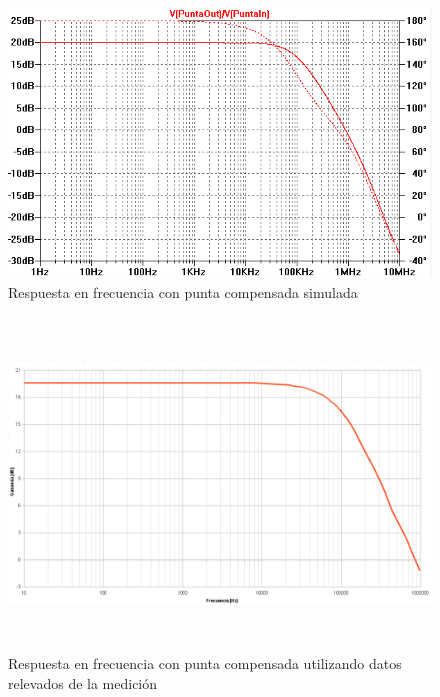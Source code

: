 \documentclass[10pt,spanish,a4paper,openany,notitlepage]{article}
\begin{document}
\begin{enumerate}
\begin{figure}[H]
\centering
\includegraphics[scale=0.8]{simulaciones/A2puntax10.png}
\caption{Respuesta en frecuencia con punta compensada simulada}
\label{fig:2_10x}
\end{figure}

\begin{figure}[H]
\centering
\includegraphics[width=350pt, height=250pt]{mediciones/A2dB_vs_Frec.png}
\caption{Respuesta en frecuencia con punta compensada utilizando datos relevados de la medición}
\label{fig:2_med_10x}
\end{figure}



\end{enumerate}
\end{document}
